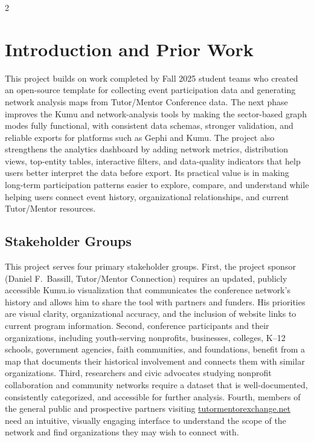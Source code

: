 \documentclass[11pt,letterpaper]{article}
\begin{document}
\begin{multicols}{2}
\section{Introduction and Prior Work}

This project builds on work completed by Fall 2025 student teams who created
an open-source template for collecting event participation data and generating
network analysis maps from Tutor/Mentor Conference data. The next phase
improves the Kumu and network-analysis tools by making the sector-based graph
modes fully functional, with consistent data schemas, stronger validation, and
reliable exports for platforms such as Gephi and Kumu. The project also
strengthens the analytics dashboard by adding network metrics, distribution
views, top-entity tables, interactive filters, and data-quality indicators that
help users better interpret the data before export. Its practical value is in
making long-term participation patterns easier to explore, compare, and
understand while helping users connect event history, organizational
relationships, and current Tutor/Mentor resources.

\subsection{Stakeholder Groups}

This project serves four primary stakeholder groups. First, the project sponsor
(Daniel F.\ Bassill, Tutor/Mentor Connection) requires an updated, publicly
accessible Kumu.io visualization that communicates the conference network's
history and allows him to share the tool with partners and funders. His
priorities are visual clarity, organizational accuracy, and the inclusion of
website links to current program information. Second, conference participants
and their organizations, including youth-serving nonprofits, businesses,
colleges, K--12 schools, government agencies, faith communities, and
foundations, benefit from a map that documents their historical involvement and
connects them with similar organizations. Third, researchers and civic advocates
studying nonprofit collaboration and community networks require a dataset that
is well-documented, consistently categorized, and accessible for further
analysis. Fourth, members of the general public and prospective partners
visiting \href{https://tutormentorexchange.net}{tutormentorexchange.net} need an
intuitive, visually engaging interface to understand the scope of the network
and find organizations they may wish to connect with.


\end{multicols}
\end{document}
